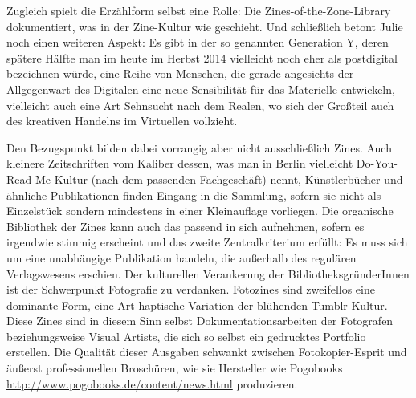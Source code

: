 \documentclass[a4paper,
fontsize=11pt,
oneside,
numbers=noperiodatend,
parskip=half-,
bibliography=totoc,
final
]{scrartcl}
\begin{document}
Zugleich spielt die Erzählform selbst eine Rolle: Die
Zines-of-the-Zone-Library dokumentiert, was in der Zine-Kultur wie
geschieht. Und schließlich betont Julie noch einen weiteren Aspekt: Es
gibt in der so genannten Generation Y, deren spätere Hälfte man im heute
im Herbst 2014 vielleicht noch eher als postdigital bezeichnen würde,
eine Reihe von Menschen, die gerade angesichts der Allgegenwart des
Digitalen eine neue Sensibilität für das Materielle entwickeln,
vielleicht auch eine Art Sehnsucht nach dem Realen, wo sich der Großteil
auch des kreativen Handelns im Virtuellen vollzieht.

Den Bezugspunkt bilden dabei vorrangig aber nicht ausschließlich Zines.
Auch kleinere Zeitschriften vom Kaliber dessen, was man in Berlin
vielleicht Do-You-Read-Me-Kultur (nach dem passenden Fachgeschäft)
nennt, Künstlerbücher und ähnliche Publikationen finden Eingang in die
Sammlung, sofern sie nicht als Einzelstück sondern mindestens in einer
Kleinauflage vorliegen. Die organische Bibliothek der Zines kann auch
das passend in sich aufnehmen, sofern es irgendwie stimmig erscheint und
das zweite Zentralkriterium erfüllt: Es muss sich um eine unabhängige
Publikation handeln, die außerhalb des regulären Verlagswesens erschien.
Der kulturellen Verankerung der BibliotheksgründerInnen ist der
Schwerpunkt Fotografie zu verdanken. Fotozines sind zweifellos eine
dominante Form, eine Art haptische Variation der blühenden
Tumblr-Kultur. Diese Zines sind in diesem Sinn selbst
Dokumentationsarbeiten der Fotografen beziehungsweise Visual Artists,
die sich so selbst ein gedrucktes Portfolio erstellen. Die Qualität
dieser Ausgaben schwankt zwischen Fotokopier-Esprit und äußerst
professionellen Broschüren, wie sie Hersteller wie Pogobooks
\url{http://www.pogobooks.de/content/news.html} produzieren.
\end{document}
